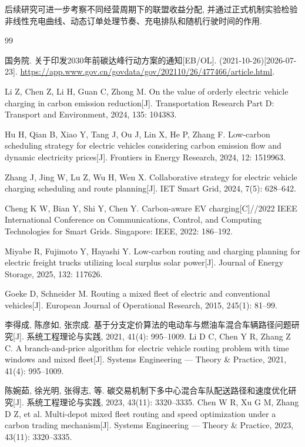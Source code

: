 \documentclass{setp-new}
\begin{document}
后续研究可进一步考察不同经营周期下的联盟收益分配,
并通过正式机制实验检验非线性充电曲线、动态订单处理节奏、充电排队和随机行驶时间的作用.


\begin{thebibliography}{99}

 国务院. 关于印发2030年前碳达峰行动方案的通知[EB/OL]. (2021-10-26)[2026-07-23].
\url{https://app.www.gov.cn/govdata/gov/202110/26/477466/article.html}.

 Li Z, Chen Z, Li H, Guan C, Zhong M. On the value of orderly electric vehicle charging in carbon emission reduction[J]. Transportation Research Part D: Transport and Environment, 2024, 135: 104383.

 Hu H, Qian B, Xiao Y, Tang J, Ou J, Lin X, He P, Zhang F. Low-carbon scheduling strategy for electric vehicles considering carbon emission flow and dynamic electricity prices[J]. Frontiers in Energy Research, 2024, 12: 1519963.

 Zhang J, Jing W, Lu Z, Wu H, Wen X. Collaborative strategy for electric vehicle charging scheduling and route planning[J]. IET Smart Grid, 2024, 7(5): 628--642.

 Cheng K W, Bian Y, Shi Y, Chen Y. Carbon-aware EV charging[C]//2022 IEEE International Conference on Communications, Control, and Computing Technologies for Smart Grids. Singapore: IEEE, 2022: 186--192.

 Miyabe R, Fujimoto Y, Hayashi Y. Low-carbon routing and charging planning for electric freight trucks utilizing local surplus solar power[J]. Journal of Energy Storage, 2025, 132: 117626.

 Goeke D, Schneider M. Routing a mixed fleet of electric and conventional vehicles[J]. European Journal of Operational Research, 2015, 245(1): 81--99.

 李得成, 陈彦如, 张宗成. 基于分支定价算法的电动车与燃油车混合车辆路径问题研究[J]. 系统工程理论与实践, 2021, 41(4): 995--1009.\newline
Li D C, Chen Y R, Zhang Z C. A branch-and-price algorithm for electric vehicle routing problem with time windows and mixed fleet[J]. Systems Engineering --- Theory \& Practice, 2021, 41(4): 995--1009.

 陈婉茹, 徐光明, 张得志, 等. 碳交易机制下多中心混合车队配送路径和速度优化研究[J]. 系统工程理论与实践, 2023, 43(11): 3320--3335.\newline
Chen W R, Xu G M, Zhang D Z, et al. Multi-depot mixed fleet routing and speed optimization under a carbon trading mechanism[J]. Systems Engineering --- Theory \& Practice, 2023, 43(11): 3320--3335.


\end{thebibliography}
\end{document}
